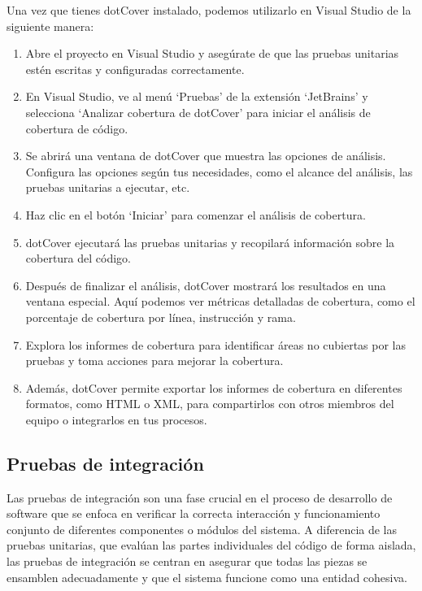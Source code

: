 \documentclass[executivepaper]{article}
\begin{document}
Una vez que tienes dotCover instalado, podemos utilizarlo en Visual Studio de la siguiente manera:

\begin{enumerate}
  \item Abre el proyecto en Visual Studio y asegúrate de que las pruebas unitarias estén escritas y configuradas correctamente.
  \item En Visual Studio, ve al menú \enquote*{Pruebas} de la extensión \enquote*{JetBrains} y selecciona \enquote*{Analizar cobertura de dotCover} para iniciar el análisis de cobertura de código.
  \item Se abrirá una ventana de dotCover que muestra las opciones de análisis. Configura las opciones según tus necesidades, como el alcance del análisis, las pruebas unitarias a ejecutar, etc.
  \item Haz clic en el botón \enquote*{Iniciar} para comenzar el análisis de cobertura.
  \item dotCover ejecutará las pruebas unitarias y recopilará información sobre la cobertura del código.
  \item Después de finalizar el análisis, dotCover mostrará los resultados en una ventana especial. Aquí podemos ver métricas detalladas de cobertura, como el porcentaje de cobertura por línea, instrucción y rama.
  \item Explora los informes de cobertura para identificar áreas no cubiertas por las pruebas y toma acciones para mejorar la cobertura.
  \item Además, dotCover permite exportar los informes de cobertura en diferentes formatos, como HTML o XML, para compartirlos con otros miembros del equipo o integrarlos en tus procesos.
\end{enumerate}

\subsection{Pruebas de integración}

Las pruebas de integración son una fase crucial en el proceso de desarrollo de software que se enfoca en verificar la correcta interacción y funcionamiento conjunto de diferentes componentes o módulos del sistema. A diferencia de las pruebas unitarias, que evalúan las partes individuales del código de forma aislada, las pruebas de integración se centran en asegurar que todas las piezas se ensamblen adecuadamente y que el sistema funcione como una entidad cohesiva.
\end{document}
